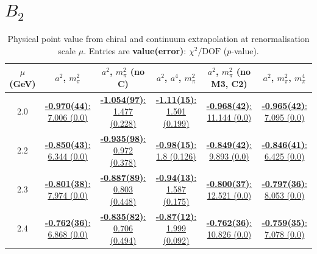 \documentclass[12pt]{extarticle}
\begin{document}
\section{$B_2$}
\begin{table}[h!]
\begin{center}
\begin{tabular}{|c|c|c|c|c|c|}
\hline
$\mu$ (GeV) & $a^2$, $m_\pi^2$& $a^2$, $m_\pi^2$ (no C)& $a^2$, $a^4$, $m_\pi^2$& $a^2$, $m_\pi^2$ (no M3, C2)& $a^2$, $m_\pi^2$, $m_\pi^4$\\
\hline
2.0& \hyperlink{VVmAA/SUSY_F/a2m2_20.pdf.1}{\textbf{-0.970(44)}: 7.006 (0.0)} & \hyperlink{VVmAA/SUSY_F/a2m2noC_20.pdf.1}{\textbf{-1.054(97)}: 1.477 (0.228)} & \hyperlink{VVmAA/SUSY_F/a2a4m2_20.pdf.1}{\textbf{-1.11(15)}: 1.501 (0.199)} & \hyperlink{VVmAA/SUSY_F/a2m2mcut_20.pdf.1}{\textbf{-0.968(42)}: 11.144 (0.0)} & \hyperlink{VVmAA/SUSY_F/a2m2m4_20.pdf.1}{\textbf{-0.965(42)}: 7.095 (0.0)}\\
2.2& \hyperlink{VVmAA/SUSY_F/a2m2_22.pdf.1}{\textbf{-0.850(43)}: 6.344 (0.0)} & \hyperlink{VVmAA/SUSY_F/a2m2noC_22.pdf.1}{\textbf{-0.935(98)}: 0.972 (0.378)} & \hyperlink{VVmAA/SUSY_F/a2a4m2_22.pdf.1}{\textbf{-0.98(15)}: 1.8 (0.126)} & \hyperlink{VVmAA/SUSY_F/a2m2mcut_22.pdf.1}{\textbf{-0.849(42)}: 9.893 (0.0)} & \hyperlink{VVmAA/SUSY_F/a2m2m4_22.pdf.1}{\textbf{-0.846(41)}: 6.425 (0.0)}\\
2.3& \hyperlink{VVmAA/SUSY_F/a2m2_23.pdf.1}{\textbf{-0.801(38)}: 7.974 (0.0)} & \hyperlink{VVmAA/SUSY_F/a2m2noC_23.pdf.1}{\textbf{-0.887(89)}: 0.803 (0.448)} & \hyperlink{VVmAA/SUSY_F/a2a4m2_23.pdf.1}{\textbf{-0.94(13)}: 1.587 (0.175)} & \hyperlink{VVmAA/SUSY_F/a2m2mcut_23.pdf.1}{\textbf{-0.800(37)}: 12.521 (0.0)} & \hyperlink{VVmAA/SUSY_F/a2m2m4_23.pdf.1}{\textbf{-0.797(36)}: 8.053 (0.0)}\\
2.4& \hyperlink{VVmAA/SUSY_F/a2m2_24.pdf.1}{\textbf{-0.762(36)}: 6.868 (0.0)} & \hyperlink{VVmAA/SUSY_F/a2m2noC_24.pdf.1}{\textbf{-0.835(82)}: 0.706 (0.494)} & \hyperlink{VVmAA/SUSY_F/a2a4m2_24.pdf.1}{\textbf{-0.87(12)}: 1.999 (0.092)} & \hyperlink{VVmAA/SUSY_F/a2m2mcut_24.pdf.1}{\textbf{-0.762(36)}: 10.826 (0.0)} & \hyperlink{VVmAA/SUSY_F/a2m2m4_24.pdf.1}{\textbf{-0.759(35)}: 7.078 (0.0)}\\
\hline
\end{tabular}
\caption{Physical point value from chiral and continuum extrapolation at renormalisation scale $\mu$. Entries are \textbf{value(error)}: $\chi^2/\text{DOF}$ ($p$-value).}
\end{center}
\end{table}
\end{document}
